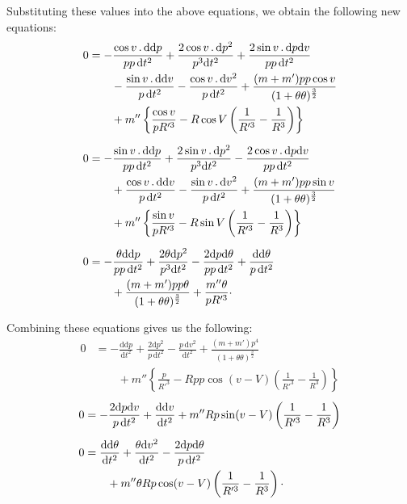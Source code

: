 \par\noindent\hspace*{\parindent}Substituting these values into the above equations, we obtain
the following new equations:
\[
\begin{aligned}
0&=-\frac{\cos v\, .\,\mathrm{dd}p}{pp\,\mathrm{d}t^2}
  +\frac{2\cos v\, .\,\mathrm{d}p^2}{p^3\mathrm{d}t^2}
  +\frac{2\sin v\, .\,\mathrm{d}p\mathrm{d}v}{pp\,\mathrm{d}t^2}\\
 &\qquad-\frac{\sin v\, .\,\mathrm{dd}v}{p\,\mathrm{d}t^2}
  -\frac{\cos v\, .\,\mathrm{d}v^2}{p\,\mathrm{d}t^2}
  +\frac{(m+m')pp\cos v}{(1+\theta\theta)^{\frac{3}{2}}}\\
 &\qquad+m''\left\{\frac{\cos v}{pR'^3}
  -R\cos V\left(\frac{1}{R'^3}-\frac{1}{R^3}\right)\right\}\\[6pt]
0&=-\frac{\sin v\, .\,\mathrm{dd}p}{pp\,\mathrm{d}t^2}
  +\frac{2\sin v\, .\,\mathrm{d}p^2}{p^3\mathrm{d}t^2}
  -\frac{2\cos v\, .\,\mathrm{d}p\mathrm{d}v}{pp\,\mathrm{d}t^2}\\
 &\qquad+\frac{\cos v\, .\,\mathrm{dd}v}{p\,\mathrm{d}t^2}
  -\frac{\sin v\, .\,\mathrm{d}v^2}{p\,\mathrm{d}t^2}
  +\frac{(m+m')pp\sin v}{(1+\theta\theta)^{\frac{3}{2}}}\\
 &\qquad+m''\left\{\frac{\sin v}{pR'^3}
  -R\sin V\left(\frac{1}{R'^3}-\frac{1}{R^3}\right)\right\}\\[6pt]
0&=-\frac{\theta\mathrm{dd}p}{pp\,\mathrm{d}t^2}
  +\frac{2\theta\mathrm{d}p^2}{p^3\mathrm{d}t^2}
  -\frac{2\mathrm{d}p\mathrm{d}\theta}{pp\,\mathrm{d}t^2}
  +\frac{\mathrm{dd}\theta}{p\,\mathrm{d}t^2}\\
 &\qquad+\frac{(m+m')pp\theta}{(1+\theta\theta)^{\frac{3}{2}}}
  +\frac{m''\theta}{pR'^3}\mathpunct{\raisebox{.4ex}{.}}
\end{aligned}
\]

\par\noindent\hspace*{\parindent}Combining these equations gives us the following:
\[
\begin{aligned}
0&=-\frac{\mathrm{dd}p}{\mathrm{d}t^2}
  +\frac{2\mathrm{d}p^2}{p\,\mathrm{d}t^2}
  -\frac{p\,\mathrm{d}v^2}{\mathrm{d}t^2}
  +\frac{(m+m')p^4}{(1+\theta\theta)^{\frac{3}{2}}}\\
 &\qquad+m''\left\{\frac{p}{R'^3}
  -Rpp\cos(v-V)\left(\frac{1}{R'^3}-\frac{1}{R^3}\right)\right\}
\end{aligned}
\]
\[
\begin{aligned}
0&=-\frac{2\mathrm{d}p\mathrm{d}v}{p\,\mathrm{d}t^2}
  +\frac{\mathrm{dd}v}{\mathrm{d}t^2}
  +m''Rp\sin(v-V)\left(\frac{1}{R'^3}-\frac{1}{R^3}\right)\\[5pt]
0&=\frac{\mathrm{dd}\theta}{\mathrm{d}t^2}
  +\frac{\theta\mathrm{d}v^2}{\mathrm{d}t^2}
  -\frac{2\mathrm{d}p\mathrm{d}\theta}{p\,\mathrm{d}t^2}\\
 &\qquad+m''\theta Rp\cos(v-V)\left(\frac{1}{R'^3}-\frac{1}{R^3}\right)
  \mathpunct{\raisebox{.4ex}{.}}
\end{aligned}
\]

